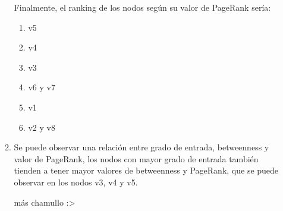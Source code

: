 \documentclass[12pt]{article}
\begin{document}
\begin{enumerate}
\begin{enumerate}
        Finalmente, el ranking de los nodos según su valor de PageRank sería:
        \begin{enumerate}
            \item v5
            \item v4
            \item v3
            \item v6 y v7
            \item v1
            \item v2 y v8
        \end{enumerate}

        \item Se puede observar una relación entre grado de entrada, betweenness y valor de PageRank, los nodos con mayor grado de entrada también tienden a tener mayor valores de betweenness y PageRank, que se puede observar en los nodos v3, v4 y v5.
        
        más chamullo :>
    \end{enumerate}
    
\end{enumerate}
\end{document}
